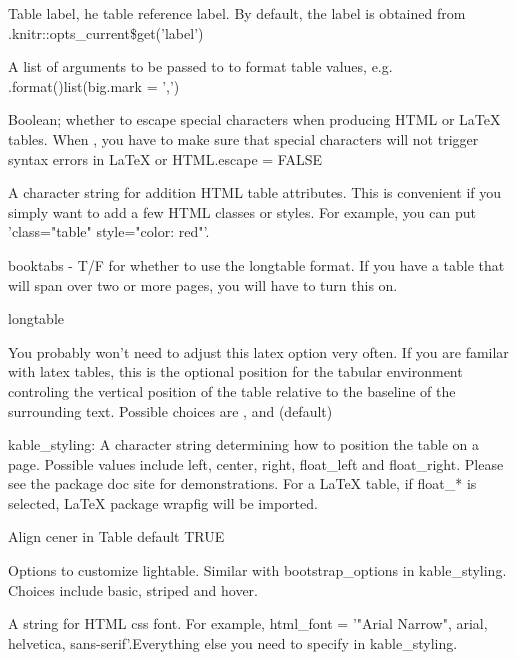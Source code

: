 \documentclass[a4paper]{book}
\begin{document}
\begin{Arguments}
\begin{ldescription}
\item[\code{label}] Table label, he table reference label. By default, the label is obtained from .knitr::opts\_current\$get('label')

\item[\code{format.args}] A list of arguments to be passed to to format table values, e.g. .format()list(big.mark = ',')

\item[\code{escape}] Boolean; whether to escape special characters when producing HTML or LaTeX tables. When , you have to make sure that special characters will not trigger syntax errors in LaTeX or HTML.escape = FALSE

\item[\code{table.attr}] A character string for addition HTML table attributes. This is convenient if you simply want to add a few HTML classes or styles. For example, you can put 'class="table" style="color: red"'.

\item[\code{booktabs}] booktabs - T/F for whether to use the longtable format. If you have a table that will span over two or more pages, you will have to turn this on.

\item[\code{longtable}] longtable

\item[\code{valign}] You probably won't need to adjust this latex option very often. If you are familar with latex tables, this is the optional position for the tabular environment controling the vertical position of the table relative to the baseline of the surrounding text. Possible choices are , and (default)

\item[\code{position}] kable\_styling: A character string determining how to position the table on a page. Possible values include left, center, right, float\_left and float\_right. Please see the package doc site for demonstrations. For a LaTeX table, if ⁠float\_*⁠ is selected, LaTeX package wrapfig will be imported.

\item[\code{centering}] Align cener in Table default TRUE

\item[\code{lightable\_options}] Options to customize lightable. Similar with bootstrap\_options in kable\_styling. Choices include basic, striped and hover.

\item[\code{html\_font}] A string for HTML css font. For example, html\_font = '"Arial Narrow", arial, helvetica, sans-serif'.Everything else you need to specify in kable\_styling.


\end{ldescription}
\end{Arguments}
\end{document}
